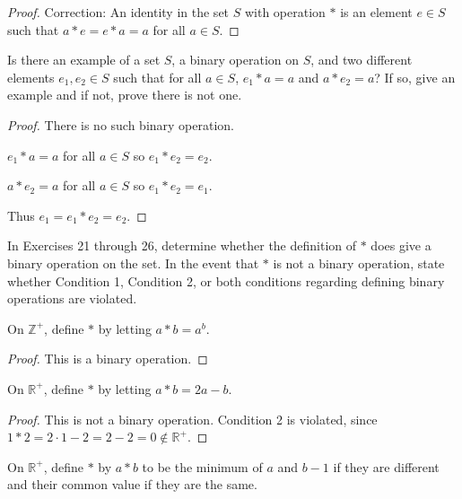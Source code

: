\begin{proof}
    Correction: An identity in the set $S$ with operation $*$ is an element $e\in S$ such that $a * e = e * a = a$ for all $a\in S$.
\end{proof}

\newpage
\begin{exercise}
    Is there an example of a set $S$, a binary operation on $S$, and two different elements $e_{1}, e_{2}\in S$ such that for all $a\in S$, $e_{1} * a = a$ and $a * e_{2} = a$? If so, give an example and if not, prove there is not one.
\end{exercise}

\begin{proof}
    There is no such binary operation.

    $e_{1} * a = a$ for all $a\in S$ so $e_{1} * e_{2} = e_{2}$.

    $a * e_{2} = a$ for all $a\in S$ so $e_{1} * e_{2} = e_{1}$.

    Thus $e_{1} = e_{1} * e_{2} = e_{2}$.
\end{proof}

In Exercises 21 through 26, determine whether the definition of $*$ does give a binary operation on the set. In the event that $*$ is not a binary operation, state whether Condition 1, Condition 2, or both conditions regarding defining binary operations are violated.

\newpage
\begin{exercise}
    On $\mathbb{Z}^{+}$, define $*$ by letting $a * b = a^{b}$.
\end{exercise}

\begin{proof}
    This is a binary operation.
\end{proof}

\newpage
\begin{exercise}
    On $\mathbb{R}^{+}$, define $*$ by letting $a * b = 2a - b$.
\end{exercise}

\begin{proof}
    This is not a binary operation. Condition 2 is violated, since $1 * 2 = 2\cdot 1 - 2 = 2 - 2 = 0\notin\mathbb{R}^{+}$.
\end{proof}

\newpage
\begin{exercise}
    On $\mathbb{R}^{+}$, define $*$ by $a * b$ to be the minimum of $a$ and $b - 1$ if they are different and their common value if they are the same.
\end{exercise}

